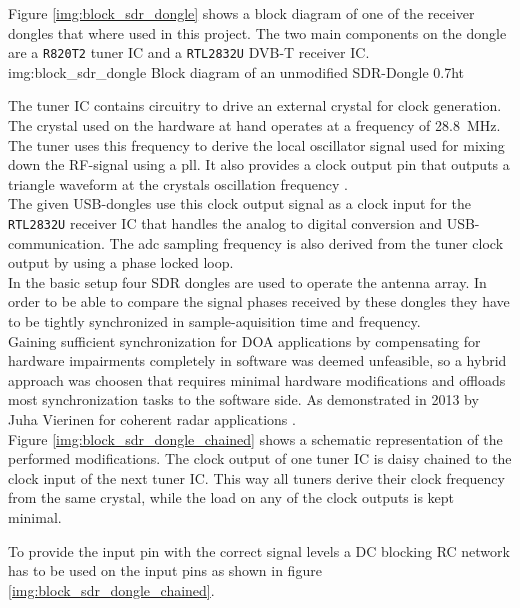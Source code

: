 Figure \ref{img:block_sdr_dongle} shows a block
diagram of one of the receiver dongles that where used
in this project.
The two main components on the dongle are a
\texttt{R820T2} tuner IC
and a \texttt{RTL2832U} DVB-T receiver IC. \\

             {img:block_sdr_dongle}
             {Block diagram of an unmodified SDR-Dongle}
             {0.7}{ht}

The tuner IC contains circuitry to drive an
external crystal for clock generation.
The crystal used on the hardware at hand
operates at a frequency of \SI{28.8}{\mega\hertz}.
The tuner uses this frequency to derive the
local oscillator signal used for mixing down
the RF-signal using a \gls{pll}.
It also provides a clock output pin that
outputs a triangle waveform at the crystals
oscillation frequency \cite{r820t2datasheet}. \\

The given USB-dongles use this clock output signal
as a clock input for the \texttt{RTL2832U}
receiver IC that handles the analog to digital
conversion and USB-communication.
The \gls{adc} sampling frequency is also derived from
the tuner clock output by using a phase locked loop. \\

In the basic setup four SDR dongles are used
to operate the antenna array.
In order to be able to compare the signal phases
received by these dongles they have to be tightly
synchronized in sample-aquisition time and frequency. \\

Gaining sufficient synchronization for DOA applications
by compensating for hardware impairments completely
in software was deemed unfeasible, so a hybrid
approach was choosen that requires minimal hardware
modifications and offloads most synchronization tasks
to the software side.
As demonstrated in 2013 by Juha Vierinen for
coherent radar applications \cite{rtlradar}. \\

Figure \ref{img:block_sdr_dongle_chained} shows
a schematic representation of the performed modifications.
The clock output of one tuner IC is daisy chained to
the clock input of the next tuner IC.
This way all tuners derive their clock frequency
from the same crystal, while the load on any of
the clock outputs is kept minimal.

To provide the input pin with the correct signal
levels a DC blocking RC network has to be used
on the input pins as shown in
figure \ref{img:block_sdr_dongle_chained}.

